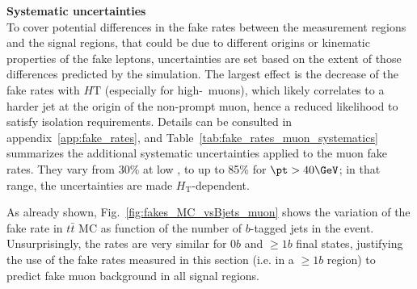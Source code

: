 \begin{table}[t!]
\def\arraystretch{1.15}
\caption{Additional systematic uncertainty on the muon fake rates, to address variations of the latter in different environments. 
The table also shows the correction factors and uncertainties applied to final states with $\ge 2$ $b$-tagged jets.}
\label{tab:fake_rates_muon_systematics}
\def\arraystretch{1.15}
\centering
{}
\end{table}


\par{\bf Systematic uncertainties\\}
To cover potential differences in the fake rates between the measurement regions and the signal regions, 
that could be due to different origins or kinematic properties of the fake leptons, 
uncertainties are set based on the extent of those differences predicted by the simulation. 
The largest effect is the decrease of the fake rates with $H\mathrm{T}$ (especially for high-\pt\ muons), 
which likely correlates to a harder jet at the origin of the non-prompt muon, hence a reduced likelihood to satisfy isolation requirements. 
Details can be consulted in appendix~\ref{app:fake_rates}, 
and Table~\ref{tab:fake_rates_muon_systematics} summarizes the additional systematic uncertainties applied to the muon fake rates. 
They vary from $30\%$ at low \pt, to up to 85\% for $\pt>40 \GeV$; in that range, the uncertainties are made $H_\mathrm{T}$-dependent. 

As already shown, Fig.~\ref{fig:fakes_MC_vsBjets_muon} shows the variation of the fake rate in $t\bar t$ MC as function of the number of $b$-tagged jets in the event. 
Unsurprisingly, the rates are very similar for $0b$ and $\ge 1b$ final states, 
justifying the use of the fake rates measured in this section (i.e. in a $\ge 1b$ region) to predict fake muon background in all signal regions. 

